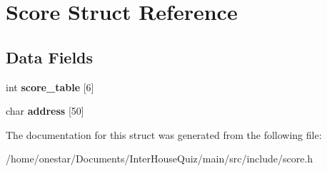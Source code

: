 \hypertarget{struct_score}{\section{Score Struct Reference}
\label{struct_score}
}
\subsection*{Data Fields}
\begin{DoxyCompactItemize}
\item 
\hypertarget{struct_score_aa5fb5a0021da3b9526e4ce8cc490815d}{int {\bfseries score\+\_\+table} \mbox{[}6\mbox{]}}\label{struct_score_aa5fb5a0021da3b9526e4ce8cc490815d}

\item 
\hypertarget{struct_score_ad0901e096b9f3bd4aec771a7cfe5c06a}{char {\bfseries address} \mbox{[}50\mbox{]}}\label{struct_score_ad0901e096b9f3bd4aec771a7cfe5c06a}

\end{DoxyCompactItemize}


The documentation for this struct was generated from the following file\+:\begin{DoxyCompactItemize}
\item 
/home/onestar/\+Documents/\+Inter\+House\+Quiz/main/src/include/score.\+h\end{DoxyCompactItemize}
